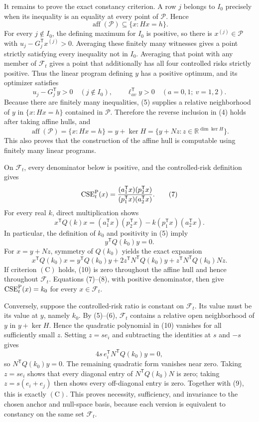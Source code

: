 It remains to prove the exact constancy criterion.  A row \(j\) belongs to \(I_0\) precisely when its inequality is an equality at every point of \(\mathcal P\).  Hence
\[
 \operatorname{aff}(\mathcal P)\subseteq\{x:Hx=h\}.          \tag{4}
\]
For every \(j\notin I_0\), the defining maximum for \(I_0\) is positive, so there is \(x^{(j)}\in\mathcal P\) with
\(u_j-G_j^{\mathsf T}x^{(j)}>0\).  Averaging these finitely many witnesses gives a point strictly satisfying every inequality not in \(I_0\).  Averaging that point with any member of \(\mathcal F_t\) gives a point that additionally has all four controlled risks strictly positive.  Thus the linear program defining \(y\) has a positive optimum, and its optimizer satisfies
\[
 u_j-G_j^{\mathsf T}y>0\quad(j\notin I_0),
 \qquad \ell_{av}^{\mathsf T}y>0\quad(a=0,1;\ v=1,2).       \tag{5}
\]
Because there are finitely many inequalities, (5) supplies a relative neighborhood of \(y\) in \(\{x:Hx=h\}\) contained in \(\mathcal P\).  Therefore the reverse inclusion in (4) holds after taking affine hulls, and
\[
 \operatorname{aff}(\mathcal P)=\{x:Hx=h\}=y+\ker H
 =\{y+Nz:z\in\mathbb R^{\dim\ker H}\}.                     \tag{6}
\]
This also proves that the construction of the affine hull is computable using finitely many linear programs.

On \(\mathcal F_t\), every denominator below is positive, and the controlled-risk definition gives
\[
 \operatorname{CSE}^{\rm P}_t(x)
 =\frac{(a_1^{\mathsf T}x)(p_2^{\mathsf T}x)}
 {(p_1^{\mathsf T}x)(a_2^{\mathsf T}x)}.                    \tag{7}
\]
For every real \(k\), direct multiplication shows
\[
 x^{\mathsf T}Q(k)x
 =(a_1^{\mathsf T}x)(p_2^{\mathsf T}x)
 -k(p_1^{\mathsf T}x)(a_2^{\mathsf T}x).                   \tag{8}
\]
In particular, the definition of \(k_0\) and positivity in (5) imply
\[
 y^{\mathsf T}Q(k_0)y=0.                                    \tag{9}
\]
For \(x=y+Nz\), symmetry of \(Q(k_0)\) yields the exact expansion
\[
 x^{\mathsf T}Q(k_0)x
 =y^{\mathsf T}Q(k_0)y
 +2z^{\mathsf T}N^{\mathsf T}Q(k_0)y
 +z^{\mathsf T}N^{\mathsf T}Q(k_0)Nz.                      \tag{10}
\]
If criterion \((\mathrm C)\) holds, (10) is zero throughout the affine hull and hence throughout \(\mathcal F_t\).  Equations (7)--(8), with positive denominator, then give \(\operatorname{CSE}^{\rm P}_t(x)=k_0\) for every \(x\in\mathcal F_t\).

Conversely, suppose the controlled-risk ratio is constant on \(\mathcal F_t\).  Its value must be its value at \(y\), namely \(k_0\).  By (5)--(6), \(\mathcal F_t\) contains a relative open neighborhood of \(y\) in \(y+\ker H\).  Hence the quadratic polynomial in (10) vanishes for all sufficiently small \(z\).  Setting \(z=se_i\) and subtracting the identities at \(s\) and \(-s\) gives
\[
 4s\,e_i^{\mathsf T}N^{\mathsf T}Q(k_0)y=0,
\]
so \(N^{\mathsf T}Q(k_0)y=0\).  The remaining quadratic form vanishes near zero.  Taking \(z=se_i\) shows that every diagonal entry of \(N^{\mathsf T}Q(k_0)N\) is zero; taking \(z=s(e_i+e_j)\) then shows every off-diagonal entry is zero.  Together with (9), this is exactly \((\mathrm C)\).  This proves necessity, sufficiency, and invariance to the chosen anchor and null-space basis, because each version is equivalent to constancy on the same set \(\mathcal F_t\).

